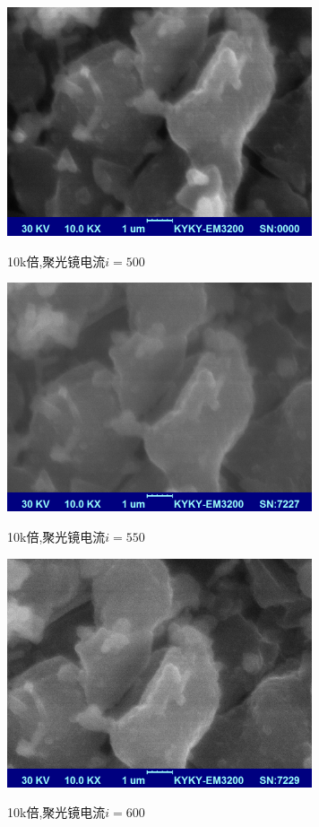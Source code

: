 \documentclass[a4paper]{article}
\begin{document}
\begin{figure}[H]
 \centering
 \caption{10k倍,聚光镜电流$i=500$}
 \includegraphics[height=6.75cm, width=9cm]{pictures/500/10k.bmp}
 \label{result:fig3}
\end{figure}

\begin{figure}[H]
 \centering
 \caption{10k倍,聚光镜电流$i=550$}
 \includegraphics[height=6.75cm, width=9cm]{pictures/550/10k.bmp}
 \label{result:fig4}
\end{figure}

\begin{figure}[H]
 \centering
 \caption{10k倍,聚光镜电流$i=600$}
 \includegraphics[height=6.75cm, width=9cm]{pictures/600/10k.bmp}
 \label{result:fig5}
\end{figure}
\end{document}
